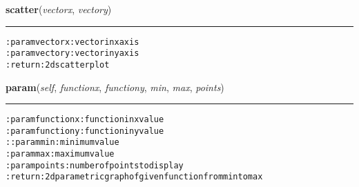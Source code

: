     \label{hal:charts:plotter:Plot2d:scatter}

    \vspace{0.5ex}

\hspace{.8\funcindent}\begin{boxedminipage}{\funcwidth}

    \raggedright \textbf{scatter}(\textit{vectorx}, \textit{vectory})

    \vspace{-1.5ex}

    \rule{\textwidth}{0.5\fboxrule}
\setlength{\parskip}{2ex}
\begin{alltt}

:param vectorx: vector in x axis
:param vectory: vector in y axis
:return: 2d scatter plot
\end{alltt}

\setlength{\parskip}{1ex}
    \end{boxedminipage}

    \label{hal:charts:plotter:Plot2d:param}

    \vspace{0.5ex}

\hspace{.8\funcindent}\begin{boxedminipage}{\funcwidth}

    \raggedright \textbf{param}(\textit{self}, \textit{functionx}, \textit{functiony}, \textit{min}, \textit{max}, \textit{points})

    \vspace{-1.5ex}

    \rule{\textwidth}{0.5\fboxrule}
\setlength{\parskip}{2ex}
\begin{alltt}

:param functionx: function in x value
:param functiony: function in y value
::param min: minimum value
:param max: maximum value
:param points: number of points to display
:return: 2d parametric graph of given function from min to max
\end{alltt}

\setlength{\parskip}{1ex}
    \end{boxedminipage}


